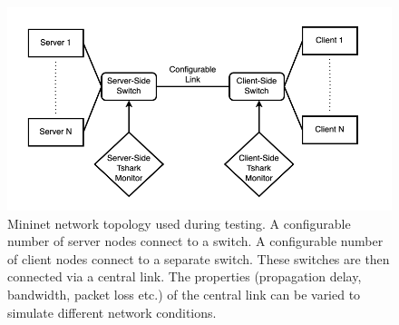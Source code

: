 \documentclass{mpaper}
\begin{document}
\begin{figure}[htb]
  \begin{center}
  \includegraphics[scale=0.30]{Network_Topology.png}
  \end{center}
  
  \caption{\label{fig:Mininet}Mininet network topology used during testing. A configurable number of server nodes connect to a switch. A configurable number of client nodes connect to a separate switch. These switches are then connected via a central link. The properties (propagation delay, bandwidth, packet loss etc.) of the central link can be varied to simulate different network conditions.}
\end{figure}
\end{document}
